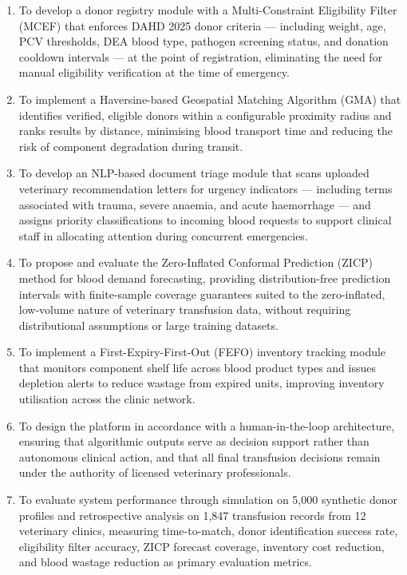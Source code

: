 \documentclass[12pt,a4paper]{article}
\begin{document}
\begin{enumerate}[leftmargin=1.8em, itemsep=0.5em]
    \item To develop a donor registry module with a Multi-Constraint Eligibility Filter (MCEF) that enforces DAHD 2025 donor criteria — including weight, age, PCV thresholds, DEA blood type, pathogen screening status, and donation cooldown intervals — at the point of registration, eliminating the need for manual eligibility verification at the time of emergency.
    \item To implement a Haversine-based Geospatial Matching Algorithm (GMA) that identifies verified, eligible donors within a configurable proximity radius and ranks results by distance, minimising blood transport time and reducing the risk of component degradation during transit.
    \item To develop an NLP-based document triage module that scans uploaded veterinary recommendation letters for urgency indicators — including terms associated with trauma, severe anaemia, and acute haemorrhage — and assigns priority classifications to incoming blood requests to support clinical staff in allocating attention during concurrent emergencies.
    \item To propose and evaluate the Zero-Inflated Conformal Prediction (ZICP) method for blood demand forecasting, providing distribution-free prediction intervals with finite-sample coverage guarantees suited to the zero-inflated, low-volume nature of veterinary transfusion data, without requiring distributional assumptions or large training datasets.
    \item To implement a First-Expiry-First-Out (FEFO) inventory tracking module that monitors component shelf life across blood product types and issues depletion alerts to reduce wastage from expired units, improving inventory utilisation across the clinic network.
    \item To design the platform in accordance with a human-in-the-loop architecture, ensuring that algorithmic outputs serve as decision support rather than autonomous clinical action, and that all final transfusion decisions remain under the authority of licensed veterinary professionals.
    \item To evaluate system performance through simulation on 5,000 synthetic donor profiles and retrospective analysis on 1,847 transfusion records from 12 veterinary clinics, measuring time-to-match, donor identification success rate, eligibility filter accuracy, ZICP forecast coverage, inventory cost reduction, and blood wastage reduction as primary evaluation metrics.
\end{enumerate}
\end{document}
